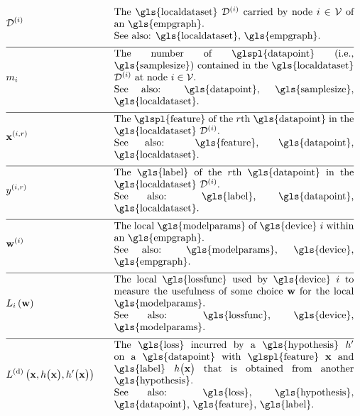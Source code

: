 \begin{align} 
	&\localdataset{\nodeidx} & \quad & \parbox{.70\textwidth}{The \gls{localdataset} $\localdataset{\nodeidx}$ carried by 
		node $\nodeidx\in \nodes$ of an \gls{empgraph}.
		\\ See also: \gls{localdataset}, \gls{empgraph}. } \nonumber \\[2mm] \hline \nonumber\\[-5mm] 
	&\localsamplesize{\nodeidx} & \quad & \parbox{.70\textwidth}{The number of \glspl{datapoint} (i.e., \gls{samplesize}) contained in the 
		\gls{localdataset} $\localdataset{\nodeidx}$ at node $\nodeidx\in \nodes$.
		\\ See also: \gls{datapoint}, \gls{samplesize}, \gls{localdataset}. } \nonumber \\[2mm] \hline \nonumber\\[-5mm]
	&\featurevec^{(\nodeidx,\sampleidx)} & \quad & \parbox{.70\textwidth}{The \glspl{feature} of the $\sampleidx$th \gls{datapoint} in 
		the \gls{localdataset} $\localdataset{\nodeidx}$.
		\\ See also: \gls{feature}, \gls{datapoint}, \gls{localdataset}. } \nonumber \\[2mm] \hline \nonumber\\[-5mm]
	&\truelabel^{(\nodeidx,\sampleidx)} & \quad & \parbox{.70\textwidth}{The \gls{label} of the $\sampleidx$th \gls{datapoint} in 
		the \gls{localdataset} $\localdataset{\nodeidx}$.
		\\ See also: \gls{label}, \gls{datapoint}, \gls{localdataset}. } \nonumber \\[2mm] \hline \nonumber\\[-5mm]
	&\localparams{\nodeidx} & \quad & \parbox{.70\textwidth}{The local \gls{modelparams} of \gls{device} $\nodeidx$ within an \gls{empgraph}.
		\\ See also: \gls{modelparams}, \gls{device}, \gls{empgraph}. } \nonumber \\[2mm] \hline \nonumber\\[-5mm]
	&\locallossfunc{\nodeidx}{\weights} & \quad & \parbox{.70\textwidth}{The local \gls{lossfunc} used by \gls{device} $\nodeidx$ 
		to measure the usefulness of some choice $\weights$ for the local \gls{modelparams}.
		\\ See also: \gls{lossfunc}, \gls{device}, \gls{modelparams}. }\nonumber \\[2mm] \hline \nonumber\\[-5mm]
	& \gtvloss{\featurevec}{\hypothesis\big(\featurevec\big)}{\hypothesis'\big(\featurevec\big)}& \quad & \parbox{.70\textwidth}{The \gls{loss} 
		incurred by a \gls{hypothesis} $\hypothesis'$ on a \gls{datapoint} with \glspl{feature} $\featurevec$ and \gls{label} 
		$\hypothesis\big( \featurevec\big)$ that is obtained from another \gls{hypothesis}.
		\\ See also: \gls{loss}, \gls{hypothesis}, \gls{datapoint}, \gls{feature}, \gls{label}. }\nonumber 
\end{align} 

